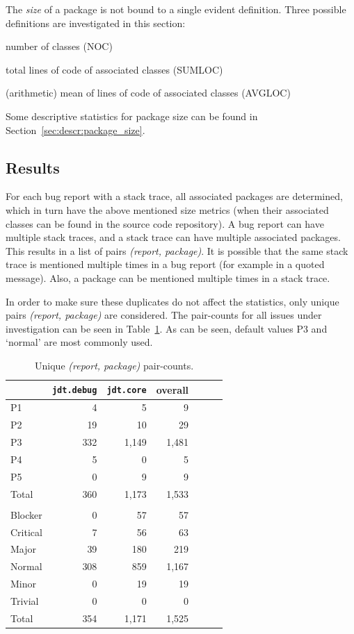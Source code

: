 The \emph{size} of a package is not bound to a single evident definition. Three possible definitions are investigated in this section:

\begin{enumerate*}
	\item number of classes (NOC)
	\item total lines of code of associated classes (SUMLOC)
	\item (arithmetic) mean of lines of code of associated classes (AVGLOC)
\end{enumerate*}

Some descriptive statistics for package size can be found in Section~\ref{sec:descr:package_size}.

\subsection{Results} %
For each bug report with a stack trace, all associated packages are determined, which in turn have the above mentioned size metrics (when their associated classes can be found in the source code repository). A bug report can have multiple stack traces, and a stack trace can have multiple associated packages. This results in a list of pairs \emph{(report, package)}. It is possible that the same stack trace is mentioned multiple times in a bug report (for example in a quoted message). Also, a package can be mentioned multiple times in a stack trace.

In order to make sure these duplicates do not affect the statistics, only unique pairs \emph{(report, package)} are considered. The pair-counts for all issues under investigation can be seen in Table~\ref{tab:package-tuple-counts}. As can be seen, default values P3 and `normal' are most commonly used.

\begin{table}[!ht]\footnotesize
	\centering
	\begin{tabular}{lrrrrrr}
		\toprule
		 & \texttt{jdt.debug} & \texttt{jdt.core} & overall\\
		\midrule
		P1 & 4 & 5 & 9\\
		P2 & 19 & 10 & 29\\
		P3 & 332 & 1,149 & 1,481\\
		P4 & 5 & 0 & 5\\
		P5 & 0 & 9 & 9\\
		\midrule
		Total & 360 & 1,173 & 1,533\\
		\midrule
		\\
		Blocker & 0 & 57 & 57\\
		Critical & 7 & 56 & 63\\
		Major & 39 & 180 & 219\\
		Normal & 308 & 859 & 1,167\\
		Minor & 0 & 19 & 19\\
		Trivial & 0 & 0 & 0\\
		\midrule
		Total & 354 & 1,171 & 1,525\\
		\bottomrule
	\end{tabular} 
	\caption{Unique \emph{(report, package)} pair-counts.}
	\label{tab:package-tuple-counts}
\end{table}

